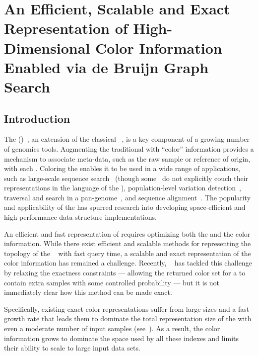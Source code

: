 \chapter{An Efficient, Scalable and Exact Representation of High-Dimensional Color Information Enabled via de Bruijn Graph Search}
\label{chap:mantis}


\section{Introduction}\label{sec:intro}

The \longcdbg (\cdbg)~\cite{IqbalCaTu12}, an extension of the classical
\dbg~\citep{pevzner2001eulerian,pevzner2001fragment,chikhi2014representation},
is a key component of a growing number of genomics tools. Augmenting the traditional
\dbg with ``color'' information provides a mechanism to associate meta-data,
such as the raw sample or reference of origin, with each \kmer. Coloring the \dbg
enables it to be used in a wide range of applications, such as large-scale sequence
search~\citep{mantis, Solomon2016Fast, Solomon2017Improved,
Sun2017Allsome, bradley2017real} (though some~\citep{Solomon2016Fast, Solomon2017Improved,Sun2017Allsome}
do not explicitly couch their representations in
the language of the \cdbg), population-level variation
detection~\cite{MuggliBoNo17, holley2016bloom, rainbowfish}, traversal and search
in a pan-genome~\cite{holley2016bloom}, and sequence
alignment~\cite{liu2016debga}. The popularity and applicability of the
\cdbg has spurred research into developing space-efficient and high-performance
data-structure implementations.

An efficient and fast representation of \cdbg requires optimizing both the \dbg and the
color information.  While there exist efficient and scalable methods
for representing the topology of the
\dbg~\cite{chikhi2012space,salikhov2014using,bowe2012succinct,chikhi2014representation,crawford2018practical,PandeyBeJo2017d}
with fast query time, a scalable and exact representation of the color
information has remained a challenge. Recently, ~\citet{doi:10.1093/bioinformatics/bty632}
has tackled this challenge by relaxing the exactness
constraints --- allowing the returned color set for a \kmer to contain extra
samples with some controlled probability --- but it is not immediately clear how
this method can be made exact.

Specifically,  existing exact color representations suffer from large
sizes and a fast growth rate that leads them to dominate the total
representation size of the \cdbg with even a moderate number of input
samples (see~).  As a result, the color information grows to
dominate the space used by all these indexes and limits their ability to scale
to large input data sets.

